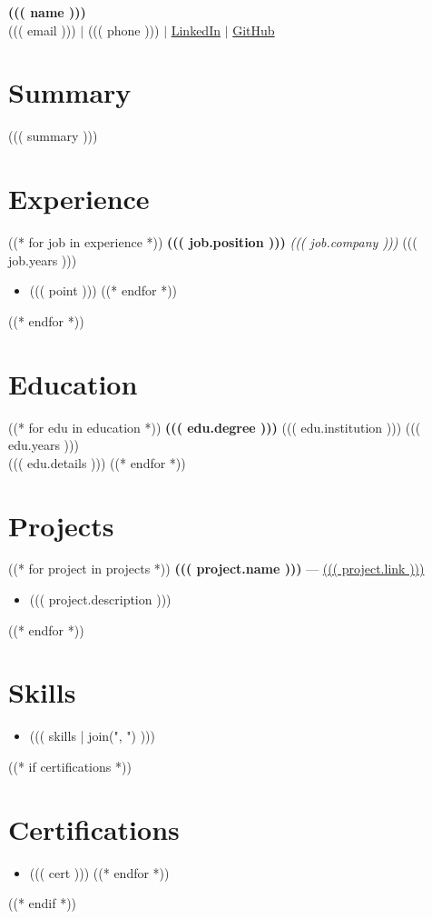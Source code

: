 \documentclass[a4paper,10pt]{article}
\begin{document}
\begin{center}
    {\LARGE \textbf{((( name )))}}\\
    ((( email ))) $|$ ((( phone ))) $|$ \href{((( linkedin )))}{LinkedIn} $|$ \href{((( github )))}{GitHub}
\end{center}

\section*{Summary}
((( summary )))

\section*{Experience}
((* for job in experience *))
\textbf{((( job.position )))} \hfill \textit{((( job.company )))} \hfill ((( job.years )))\\
\begin{itemize}[leftmargin=1.5em]
    ((* for point in job.details *))
    \item ((( point )))
    ((* endfor *))
\end{itemize}
((* endfor *))

\section*{Education}
((* for edu in education *))
\textbf{((( edu.degree )))} \hfill ((( edu.institution ))) \hfill ((( edu.years )))\\
((( edu.details )))
((* endfor *))

\section*{Projects}
((* for project in projects *))
\textbf{((( project.name )))} --- \href{((( project.link )))}{((( project.link )))}
\begin{itemize}[leftmargin=1.5em]
    \item ((( project.description )))
\end{itemize}
((* endfor *))

\section*{Skills}
\begin{itemize}[label={},leftmargin=0em]
    \item ((( skills | join(", ") )))
\end{itemize}

((* if certifications *))
\section*{Certifications}
\begin{itemize}[leftmargin=1.5em]
((* for cert in certifications *))
    \item ((( cert )))
((* endfor *))
\end{itemize}
((* endif *))
\end{document}
